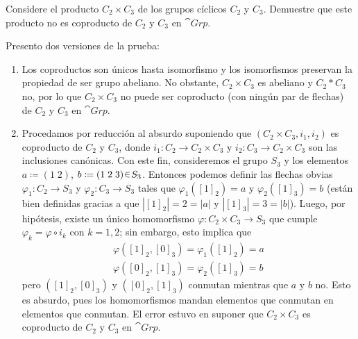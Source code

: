 \begin{ejer}
    Considere el producto $C_2 \times C_3$ de los grupos cíclicos $C_2$ y $C_3$. Demuestre que este producto no es coproducto de $C_2$ y $C_3$ en $\cat{Grp}$.
\end{ejer}
\begin{sol}
    Presento dos versiones de la prueba:
    \begin{enumerate}[label=\alph*)]
    \item Los coproductos son únicos hasta isomorfismo y los isomorfismos preservan la propiedad de ser grupo abeliano. No obstante, $C_2 \times C_3$ es abeliano y $C_2 * C_3$ no, por lo que $C_2 \times C_3$ no puede ser coproducto (con ningún par de flechas) de $C_2$ y $C_3$ en $\cat{Grp}$.

    \item Procedamos por reducción al absurdo suponiendo que $(C_2 \times C_3, i_1, i_2)$ es coproducto de $C_2$ y $C_3$, donde $i_1 \colon C_2 \to C_2 \times C_3$ y $i_2 \colon C_3 \to C_2 \times C_3$ son las inclusiones canónicas. Con este fin, consideremos el grupo $S_3$ y los elementos 
    \(
        a \coloneq (1 \; 2)
        \), \(%
        b \coloneq (1 \; 2 \; 3)%
        \en S_3
    \).
    Entonces podemos definir las flechas obvias $\varphi_1 \colon C_2 \to S_3$ y $\varphi_2 \colon C_3 \to S_3$ tales que $\varphi_1([1]_2) = a$ y $\varphi_2([1]_3) = b$ (están bien definidas gracias a que $|[1]_2| = 2 = |a|$ y $|[1]_3| = 3 = |b|$). Luego, por hipótesis, existe un único homomorfismo $\varphi \colon C_2 \times C_3 \to S_3$ que cumple $\varphi_k = \varphi \circ i_k$ con $k = 1,2$; sin embargo, esto implica que 
    \begin{gather*}
        \varphi([1]_2, [0]_3) = \varphi_1([1]_2) = a\\
        \varphi([0]_2, [1]_3) = \varphi_2([1]_3) = b
    \end{gather*}
    pero $([1]_2, [0]_3)$ y $([0]_2, [1]_3)$ conmutan mientras que $a$ y $b$ no. Esto es absurdo, pues los homomorfismos mandan elementos que conmutan en elementos que conmutan. El error estuvo en suponer que $C_2 \times C_3$ es coproducto de $C_2$ y $C_3$ en $\cat{Grp}$. \qedhere
    \end{enumerate}
\end{sol}



